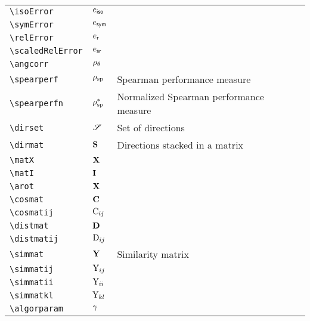 \begin{longtable}{lll}
 {\color[rgb]{0.5,0.5,0.5}\texttt{\textbackslash isoError}} & $e_{\textsf{iso}}$ & \\ 
 {\color[rgb]{0.5,0.5,0.5}\texttt{\textbackslash symError}} & $e_{\textsf{sym}}$ & \\ 
 {\color[rgb]{0.5,0.5,0.5}\texttt{\textbackslash relError}} & $e_{\textsf{r}}$ & \\ 
 {\color[rgb]{0.5,0.5,0.5}\texttt{\textbackslash scaledRelError}} & $e_{\textsf{sr}}$ & \\ 
 {\color[rgb]{0.5,0.5,0.5}\texttt{\textbackslash angcorr}} & $\rho_{\theta}$ & \\ 
 {\color[rgb]{0.5,0.5,0.5}\texttt{\textbackslash spearperf}} & $\rho_{\textrm{sp}}$ &  Spearman performance measure\\ 
 {\color[rgb]{0.5,0.5,0.5}\texttt{\textbackslash spearperfn}} & $\rho^{\ast}_{\textrm{sp}}$ &  Normalized Spearman performance measure\\ 
 {\color[rgb]{0.5,0.5,0.5}\texttt{\textbackslash dirset}} & $\mathscr{S}$ &  Set of directions\\ 
 {\color[rgb]{0.5,0.5,0.5}\texttt{\textbackslash dirmat}} & $\mathbf{S}$ &  Directions stacked in a matrix\\ 
 {\color[rgb]{0.5,0.5,0.5}\texttt{\textbackslash matX}} & $\mathbf{X}$ & \\ 
 {\color[rgb]{0.5,0.5,0.5}\texttt{\textbackslash matI}} & $\mathbf{I}$ & \\ 
 {\color[rgb]{0.5,0.5,0.5}\texttt{\textbackslash arot}} & $\mathbf{X}$ & \\ 
 {\color[rgb]{0.5,0.5,0.5}\texttt{\textbackslash cosmat}} & $\mathbf{C}$ & \\ 
 {\color[rgb]{0.5,0.5,0.5}\texttt{\textbackslash cosmatij}} & $\mathrm{C}_{ij}$ & \\ 
 {\color[rgb]{0.5,0.5,0.5}\texttt{\textbackslash distmat}} & $\mathbf{D}$ & \\ 
 {\color[rgb]{0.5,0.5,0.5}\texttt{\textbackslash distmatij}} & $\mathrm{D}_{ij}$ & \\ 
 {\color[rgb]{0.5,0.5,0.5}\texttt{\textbackslash simmat}} & $\mathbf{Y}$ &  Similarity matrix\\ 
 {\color[rgb]{0.5,0.5,0.5}\texttt{\textbackslash simmatij}} & $\mathrm{Y}_{ij}$ & \\ 
 {\color[rgb]{0.5,0.5,0.5}\texttt{\textbackslash simmatii}} & $\mathrm{Y}_{ii}$ & \\ 
 {\color[rgb]{0.5,0.5,0.5}\texttt{\textbackslash simmatkl}} & $\mathrm{Y}_{kl}$ & \\ 
 {\color[rgb]{0.5,0.5,0.5}\texttt{\textbackslash algorparam}} & $\gamma$ & \\ 

\end{longtable}
